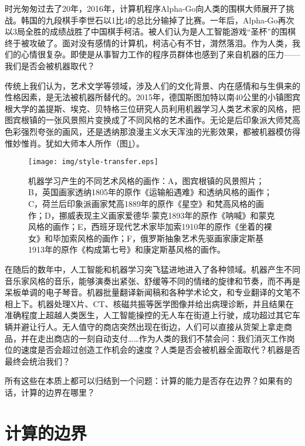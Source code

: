 \documentclass{article}
\begin{document}
时光匆匆过去了20年，2016年，计算机程序Alpha-Go向人类的围棋大师展开了挑战。韩国的九段棋手李世石以1比4的总比分输掉了比赛。一年后，Alpha-Go再次以3局全胜的成绩战胜了中国棋手柯洁。被人们认为是人工智能游戏“圣杯”的围棋终于被攻破了。面对没有感情的计算机，柯洁心有不甘，潸然落泪。作为人类，我们的心情很复杂。即使是从事智力工作的程序员群体也感到了来自机器的压力——我们是否会被机器取代？

传统上我们认为，艺术文学等领域，涉及人们的文化背景、内在感情和与生俱来的性格因素，是无法被机器所替代的。2015年，德国斯图加特以南40公里的小镇图宾根大学的盖提斯、埃克、贝特格三位研究人员利用机器学习人类艺术家的风格，把图宾根镇的一张风景照片变换成了不同风格的艺术画作\cite{Gatys-2015}。无论是后印象派大师梵高色彩强烈夸张的画风，还是透纳那浪漫主义水天浑浊的光影效果，都被机器模仿得惟妙惟肖。犹如大师本人所作（图\ref{fig:style-transfer}）。

\begin{figure}[htbp]
 \centering
 \texttt{[image: img/style-transfer.eps]}
 \caption{机器学习产生的不同艺术风格的画作：A，图宾根镇的风景照片；B，英国画家透纳1805年的原作《运输船遇难》和透纳风格的画作；C，荷兰后印象派画家梵高1889年的原作《星空》和梵高风格的画作；D，挪威表现主义画家爱德华$\cdot$蒙克1893年的原作《呐喊》和蒙克风格的画作；E，西班牙现代艺术家毕加索1910年的原作《坐着的裸女》和毕加索风格的画作；F，俄罗斯抽象艺术先驱画家康定斯基1913年的原作《构成第七号》和康定斯基风格的画作。}
 \label{fig:style-transfer}
\end{figure}

在随后的数年中，人工智能和机器学习突飞猛进地进入了各种领域。机器产生不同音乐家风格的音乐，能够演奏出紧张、舒缓等不同的情绪的旋律和节奏，而不再是呆板单调的电子琴音。机器批量翻译新闻稿和各种学术论文，和专业翻译的文笔不相上下。机器处理X片、CT、核磁共振等医学图像并给出病理诊断，并且结果在准确程度上超越人类医生，人工智能操控的无人车在街道上行驶，成功超过其它车辆并避让行人。无人值守的商店突然出现在街边，人们可以直接从货架上拿走商品，并在走出商店的一刻自动支付……作为人类的我们不禁会问：我们消灭工作岗位的速度是否会超过创造工作机会的速度？人类是否会被机器全面取代？机器是否最终会统治我们？

所有这些在本质上都可以归结到一个问题：计算的能力是否存在边界？如果有的话，计算的边界在哪里？

\section{计算的边界}
\end{document}
